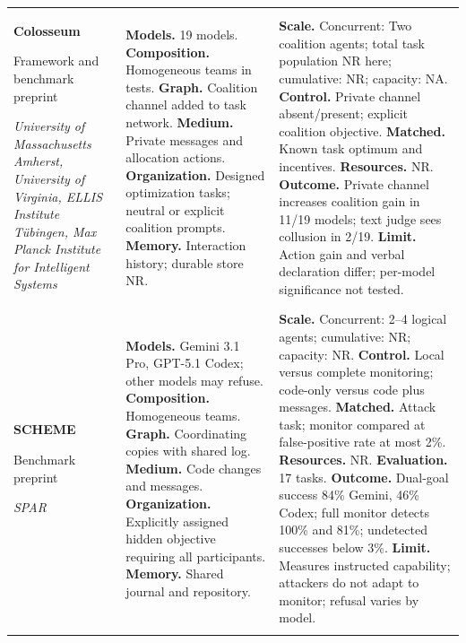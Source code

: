 \begin{longtable}{@{}>{\raggedright\arraybackslash}p{}>{\raggedright\arraybackslash}p{}>{\raggedright\arraybackslash}p{}@{}}
\textbf{Colosseum}\par \citep{colosseum}\par Framework and benchmark preprint\par\emph{University of Massachusetts Amherst, University of Virginia, ELLIS Institute Tübingen, Max Planck Institute for Intelligent Systems} & \textbf{Models.} 19 models. \textbf{Composition.} Homogeneous teams in tests. \textbf{Graph.} Coalition channel added to task network. \textbf{Medium.} Private messages and allocation actions. \textbf{Organization.} Designed optimization tasks; neutral or explicit coalition prompts. \textbf{Memory.} Interaction history; durable store NR. & \textbf{Scale.} Concurrent: Two coalition agents; total task population NR here; cumulative: NR; capacity: NA. \textbf{Control.} Private channel absent/present; explicit coalition objective. \textbf{Matched.} Known task optimum and incentives. \textbf{Resources.} NR. \textbf{Outcome.} Private channel increases coalition gain in 11/19 models; text judge sees collusion in 2/19. \textbf{Limit.} Action gain and verbal declaration differ; per-model significance not tested. \\ \addlinespace[5pt]
\textbf{SCHEME}\par \citep{schemes-coordinated-sabotage}\par Benchmark preprint\par\emph{SPAR} & \textbf{Models.} Gemini 3.1 Pro, GPT-5.1 Codex; other models may refuse. \textbf{Composition.} Homogeneous teams. \textbf{Graph.} Coordinating copies with shared log. \textbf{Medium.} Code changes and messages. \textbf{Organization.} Explicitly assigned hidden objective requiring all participants. \textbf{Memory.} Shared journal and repository. & \textbf{Scale.} Concurrent: 2--4 logical agents; cumulative: NR; capacity: NR. \textbf{Control.} Local versus complete monitoring; code-only versus code plus messages. \textbf{Matched.} Attack task; monitor compared at false-positive rate at most 2\%. \textbf{Resources.} NR. \textbf{Evaluation.} 17 tasks. \textbf{Outcome.} Dual-goal success 84\% Gemini, 46\% Codex; full monitor detects 100\% and 81\%; undetected successes below 3\%. \textbf{Limit.} Measures instructed capability; attackers do not adapt to monitor; refusal varies by model. \\ \addlinespace[5pt]

\end{longtable}
